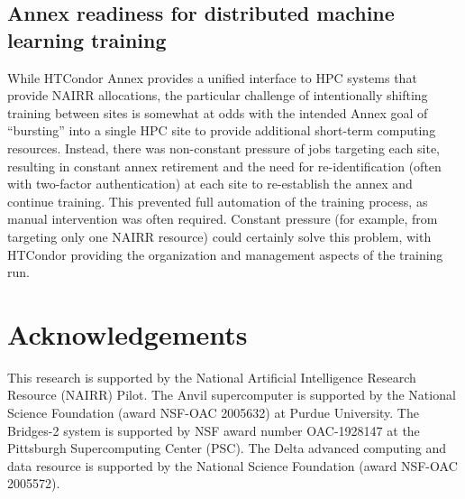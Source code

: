 \documentclass{article}
\begin{document}
\subsection{Annex readiness for distributed machine learning training}
While HTCondor Annex provides a unified interface to HPC systems that provide
NAIRR allocations, the particular challenge of intentionally shifting training
between sites is somewhat at odds with the intended Annex goal of ``bursting''
into a single HPC site to provide additional short-term computing resources.
Instead, there was non-constant pressure of jobs targeting each site, resulting
in constant annex retirement and the need for re-identification (often with
two-factor authentication) at each site to re-establish the annex and continue
training. This prevented full automation of the training process, as manual
intervention was often required. Constant pressure (for example, from targeting
only one NAIRR resource) could certainly solve this problem, with HTCondor
providing the organization and management aspects of the training run.

\section{Acknowledgements}
This research is supported by the National Artificial Intelligence Research
Resource (NAIRR) Pilot.
The Anvil supercomputer is supported by the National Science Foundation (award NSF-OAC 2005632) at Purdue University.
The Bridges-2 system is supported by NSF award number OAC-1928147 at the Pittsburgh Supercomputing Center (PSC).
The Delta advanced computing and data resource is supported by the National Science Foundation (award NSF-OAC 2005572).


\printbibliography
\end{document}
